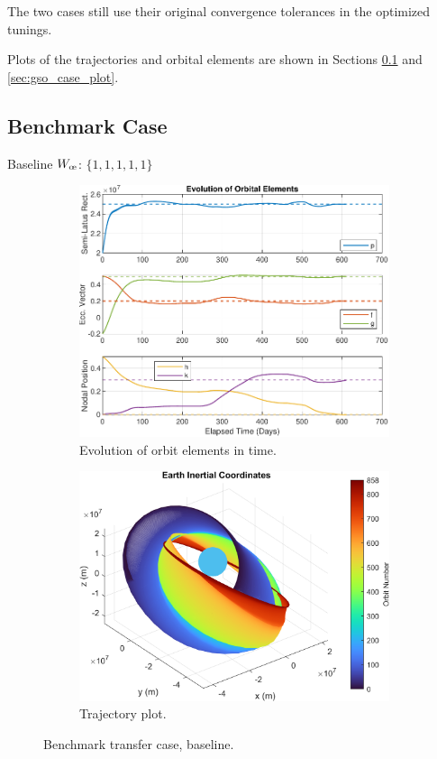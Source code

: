 The two cases still use their original convergence tolerances in the optimized tunings.

Plots of the trajectories and orbital elements are shown in Sections \ref{sec:bench_case_plot} and \ref{sec:gso_case_plot}.

\subsection{Benchmark Case}
\label{sec:bench_case_plot}
Baseline \(W_{\moe}\): \(\{1, 1, 1, 1, 1\}\)
\begin{figure}[H]
  \centering
  \begin{subfigure}[t]{0.49\textwidth}
    \includegraphics[width=\textwidth]{figures/benchmark_transfer/orbital_elements.pdf}
    \caption{Evolution of orbit elements in time.}
    \label{fig:results_benchmark_a}
  \end{subfigure}
  \begin{subfigure}[t]{0.49\textwidth}
    \includegraphics[width=\textwidth]{figures/benchmark_transfer/trajectory_plot.png}
    \caption{Trajectory plot.}
    \label{fig:results_benchmark_b}
  \end{subfigure}
  \caption{Benchmark transfer case, baseline.}
  \label{fig:results_benchmark}
\end{figure}

